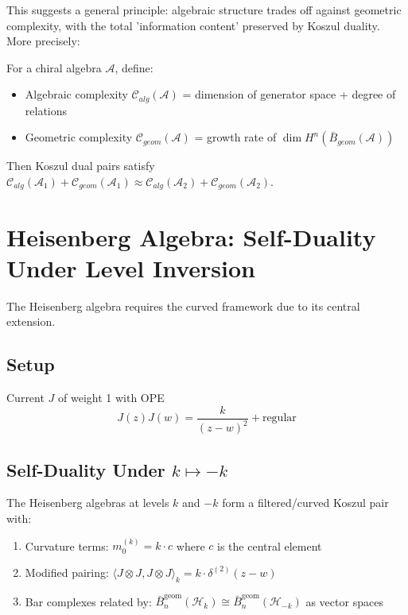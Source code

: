 This suggests a general principle: algebraic structure trades off against geometric complexity, with the total 'information content' preserved by Koszul duality. More precisely:

\begin{conjecture}
For a chiral algebra $\mathcal{A}$, define:
\begin{itemize}
\item Algebraic complexity $\mathcal{C}_{alg}(\mathcal{A})$ = dimension of generator space + degree of relations
\item Geometric complexity $\mathcal{C}_{geom}(\mathcal{A})$ = growth rate of $\dim H^n(\bar{B}_{geom}(\mathcal{A}))$
\end{itemize}
Then Koszul dual pairs satisfy $\mathcal{C}_{alg}(\mathcal{A}_1) + \mathcal{C}_{geom}(\mathcal{A}_1) \approx \mathcal{C}_{alg}(\mathcal{A}_2) + \mathcal{C}_{geom}(\mathcal{A}_2)$.
\end{conjecture}


\section{Heisenberg Algebra: Self-Duality Under Level Inversion}
 
The Heisenberg algebra requires the curved framework due to its central extension.
 
\subsection{Setup}
 
Current $J$ of weight 1 with OPE
\[
J(z)J(w) = \frac{k}{(z-w)^2} + \text{regular}
\]
 
\subsection{Self-Duality Under $k \mapsto -k$}
 
\begin{theorem}
The Heisenberg algebras at levels $k$ and $-k$ form a filtered/curved Koszul pair with:
\begin{enumerate}
\item Curvature terms: $m_0^{(k)} = k \cdot c$ where $c$ is the central element
\item Modified pairing: $\langle J \otimes J, J \otimes J \rangle_k = k \cdot \delta^{(2)}(z-w)$
\item Bar complexes related by: $\bar{B}^{\text{geom}}_n(\mathcal{H}_k) \cong \bar{B}^{\text{geom}}_n(\mathcal{H}_{-k})$ as vector spaces
\end{enumerate}
\end{theorem}
 
